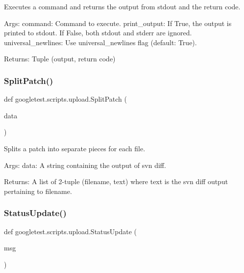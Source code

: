 \begin{DoxyVerb}Executes a command and returns the output from stdout and the return code.

Args:
  command: Command to execute.
  print_output: If True, the output is printed to stdout.
                If False, both stdout and stderr are ignored.
  universal_newlines: Use universal_newlines flag (default: True).

Returns:
  Tuple (output, return code)
\end{DoxyVerb}
 \mbox{\label{namespacegoogletest_1_1scripts_1_1upload_aeaadc3f722b1f6f78bb0f575bfadcaf9}} 
\subsubsection{\texorpdfstring{SplitPatch()}{SplitPatch()}}
{\footnotesize\ttfamily def googletest.\+scripts.\+upload.\+Split\+Patch (\begin{DoxyParamCaption}\item[{}]{data }\end{DoxyParamCaption})}

\begin{DoxyVerb}Splits a patch into separate pieces for each file.

Args:
  data: A string containing the output of svn diff.

Returns:
  A list of 2-tuple (filename, text) where text is the svn diff output
    pertaining to filename.
\end{DoxyVerb}
 \mbox{\label{namespacegoogletest_1_1scripts_1_1upload_a71b3adc6c00b755df26b2023c53c55be}} 
\subsubsection{\texorpdfstring{StatusUpdate()}{StatusUpdate()}}
{\footnotesize\ttfamily def googletest.\+scripts.\+upload.\+Status\+Update (\begin{DoxyParamCaption}\item[{}]{msg }\end{DoxyParamCaption})}

